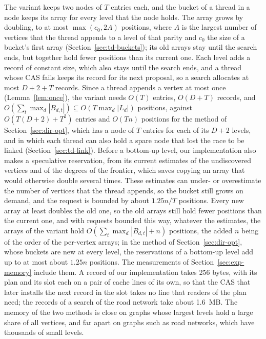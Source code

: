 The variant keeps two nodes of $T$ entries each, and the bucket of a thread in a node keeps its array for every level that the node holds. The array grows by doubling, to at most $\max(c_0, 2A)$ positions, where $A$ is the largest number of vertices that the thread appends to a level of that parity and $c_0$ the size of a bucket's first array (Section~\ref{sec:td-buckets}); its old arrays stay until the search ends, but together hold fewer positions than its current one. Each level adds a record of constant size, which also stays until the search ends, and a thread whose CAS fails keeps its record for its next proposal, so a search allocates at most $D+2+T$ records. Since a thread appends a vertex at most once (Lemma~\ref{lem:once}), the variant needs $O(T)$ entries, $O(D+T)$ records, and $O(\sum_t \max_d |B_{d,t}|) \subseteq O(T \max_d |L_d|)$ positions, against $O(T(D+2) + T^2)$ entries and $O(Tn)$ positions for the method of Section~\ref{sec:dir-opt}, which has a node of $T$ entries for each of its $D+2$ levels, and in which each thread can also hold a spare node that lost the race to be linked (Section~\ref{sec:td-link}). Before a bottom-up level, our implementation also makes a speculative reservation, from its current estimates of the undiscovered vertices and of the degrees of the frontier, which saves copying an array that would otherwise double several times. These estimates can under- or overestimate the number of vertices that the thread appends, so the bucket still grows on demand, and the request is bounded by about $1.25n/T$ positions. Every new array at least doubles the old one, so the old arrays still hold fewer positions than the current one, and with requests bounded this way, whatever the estimates, the arrays of the variant hold $O(\sum_t \max_d |B_{d,t}| + n)$ positions, the added $n$ being of the order of the per-vertex arrays; in the method of Section~\ref{sec:dir-opt}, whose buckets are new at every level, the reservations of a bottom-up level add up to at most about $1.25n$ positions. The measurements of Section~\ref{sec:exp-memory} include them. A record of our implementation takes 256 bytes, with its plan and its slot each on a pair of cache lines of its own, so that the CAS that later installs the next record in the slot takes no line that readers of the plan need; the records of a search of the road network take about 1.6~MB. The memory of the two methods is close on graphs whose largest levels hold a large share of all vertices, and far apart on graphs such as road networks, which have thousands of small levels.
